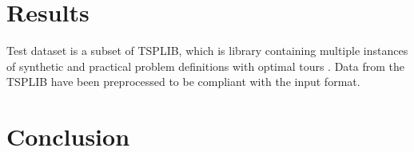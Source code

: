 \section*{Results}

Test dataset is a subset of TSPLIB, which is library containing multiple instances of synthetic and practical problem definitions with optimal tours \cite{reinhel2014tsplib}. Data from the TSPLIB have been preprocessed to be compliant with the input format.



\section*{Conclusion}
